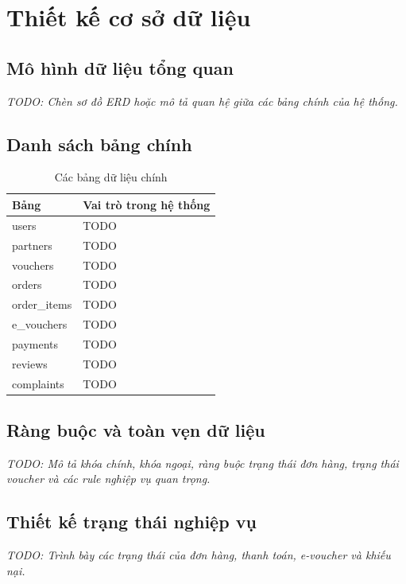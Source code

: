 \section{Thiết kế cơ sở dữ liệu}

\subsection{Mô hình dữ liệu tổng quan}
\textit{TODO: Chèn sơ đồ ERD hoặc mô tả quan hệ giữa các bảng chính của hệ thống.}


\subsection{Danh sách bảng chính}
\begin{table}[H]
\centering
\begin{tabular}{p{} p{}}
\toprule
\textbf{Bảng} & \textbf{Vai trò trong hệ thống} \\
\midrule
users & TODO \\
partners & TODO \\
vouchers & TODO \\
orders & TODO \\
order\_items & TODO \\
e\_vouchers & TODO \\
payments & TODO \\
reviews & TODO \\
complaints & TODO \\
\bottomrule
\end{tabular}
\caption{Các bảng dữ liệu chính}
\end{table}

\subsection{Ràng buộc và toàn vẹn dữ liệu}
\textit{TODO: Mô tả khóa chính, khóa ngoại, ràng buộc trạng thái đơn hàng, trạng thái voucher và các rule nghiệp vụ quan trọng.}

\subsection{Thiết kế trạng thái nghiệp vụ}
\textit{TODO: Trình bày các trạng thái của đơn hàng, thanh toán, e-voucher và khiếu nại.}


